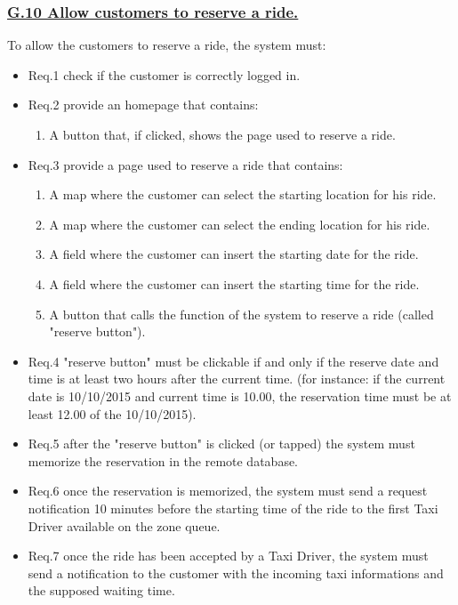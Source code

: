 \documentclass{report}
\begin{document}
			\subsubsection{\lbrack \hyperref[sec:g10]{G.10 Allow customers to reserve a ride.}\rbrack}\label{sec:frs10}
			To allow the customers to reserve a ride, the system must:

				\begin{itemize}
					\item \lbrack Req.1\rbrack \label{sec:fr1_g10} check if the customer is correctly logged in.
					\item \lbrack Req.2\rbrack \label{sec:fr2_g10} provide an homepage that contains:
						\begin{enumerate}
							\item A button that, if clicked, shows the page used to reserve a ride.
						\end{enumerate}
					\item \lbrack Req.3\rbrack \label{sec:fr3_g10} provide a page used to reserve a ride that contains:
						\begin{enumerate}
							\item A map where the customer can select the starting location for his ride.
							\item A map where the customer can select the ending location for his ride.
							\item A field where the customer can insert the starting date for the ride.
							\item A field where the customer can insert the starting time for the ride.
							\item A button that calls the function of the system to reserve a ride (called "reserve button").
						\end{enumerate}
					\item \lbrack Req.4\rbrack \label{sec:fr4_g10} "reserve button" must be clickable if and only if the reserve date and time is at least two hours after the current time. (for instance: if the current date is 10/10/2015 and current time is 10.00, the reservation time must be at least 12.00 of the 10/10/2015).
					\item \lbrack Req.5\rbrack \label{sec:fr5_g10} after the "reserve button" is clicked (or tapped) the system must memorize the reservation in the remote database.
					\item \lbrack Req.6\rbrack \label{sec:fr6_g10} once the reservation is memorized, the system must send a request notification 10 minutes before the starting time of the ride to the first Taxi Driver available on the zone queue.
					\item \lbrack Req.7\rbrack \label{sec:fr7_g10} once the ride has been accepted by a Taxi Driver, the system must send a notification to the customer with the incoming taxi informations and the supposed waiting time.
				\end{itemize}
\end{document}
